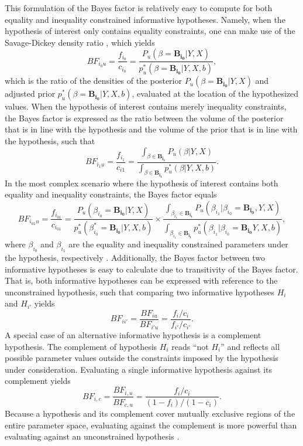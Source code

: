 \documentclass[review, 3p, authoryear]{elsarticle} %
\begin{document}
This formulation of the Bayes factor is relatively easy to compute for both equality and inequality constrained informative hypotheses.
Namely, when the hypothesis of interest only contains equality constraints, one can make use of the Savage-Dickey density ratio \citep{savage_dickey_1971}, which yields
\[
BF_{i_0u} = \frac{f_{i_0}}{c_{i_0}} = \frac{
  P_u(\beta = \boldsymbol{B_{i_0}} | Y, X)
}{
  p_u^*(\beta = \boldsymbol{B_{i_0}} | Y, X, b)
},
\]
which is the ratio of the densities of the posterior \(P_u(\beta = \boldsymbol{B_{i_0}} | Y, X)\) and adjusted prior \(p^*_u(\beta = \boldsymbol{B_{i_0}} | Y, X, b)\), evaluated at the location of the hypothesized values.
When the hypothesis of interest contains merely inequality constraints, the Bayes factor is expressed as the ratio between the volume of the posterior that is in line with the hypothesis and the volume of the prior that is in line with the hypothesis, such that
\[
BF_{i_1u} = \frac{f_{i_1}}{c_{i1}} = 
\frac{
  \int_{\beta \in \boldsymbol{B_{i_1}}} P_u(\beta | Y, X)
}{
  \int_{\beta \in \boldsymbol{B_{i_1}}} p_u^*(\beta | Y, X, b)
}.
\]
In the most complex scenario where the hypothesis of interest contains both equality and inequality constraints, the Bayes factor equals
\[
BF_{i_{01}u} = \frac{f_{i_{01}}}{c_{i_{01}}} = \frac{
  P_u(\beta_{i_0} = \boldsymbol{B_{i_0}} | Y, X)
}{
  p^*_u(\beta^*_{i_0} = \boldsymbol{B_{i_0}} | Y, X, b)
} \times
\frac{
  \int_{\beta_{i_1} \in \boldsymbol{B_{i_1}}} P_u(\beta_{i_1} | \beta_{i_0} = \boldsymbol{B_{i_0}}, Y, X)
}{
  \int_{\beta_{i_1} \in \boldsymbol{B_{i_1}}} p^*_u(\beta_{i_1} | \beta_{i_0} = \boldsymbol{B_{i_0}}Y, X, b)
},
\]
where \(\beta_{i_0}\) and \(\beta_{i_1}\) are the equality and inequality constrained parameters under the hypothesis, respectively \citep{gu_approximated_2018}.
Additionally, the Bayes factor between two informative hypotheses is easy to calculate due to transitivity of the Bayes factor.
That is, both informative hypotheses can be expressed with reference to the unconstrained hypothesis, such that comparing two informative hypotheses \(H_i\) and \(H_{i'}\) yields
\[
BF_{ii'} = \frac{BF_{iu}}{BF_{i'u}} = \frac{f_i / c_i}{f_{i'}/c_{i'}}.
\]
A special case of an alternative informative hypothesis is a complement hypothesis.
The complement of hypothesis \(H_i\) reads ``not \(H_i\)'' and reflects all possible parameter values outside the constraints imposed by the hypothesis under consideration.
Evaluating a single informative hypothesis against its complement yields
\[
BF_{i, c} = \frac{BF_{i,u}}{BF_{c,u}} = \frac{f_i/c_i}{(1 - f_i) / (1 - c_i)}.
\]
Because a hypothesis and its complement cover mutually exclusive regions of the entire parameter space, evaluating against the complement is more powerful than evaluating against an unconstrained hypothesis \citep{klugkist_volker}.
\end{document}
